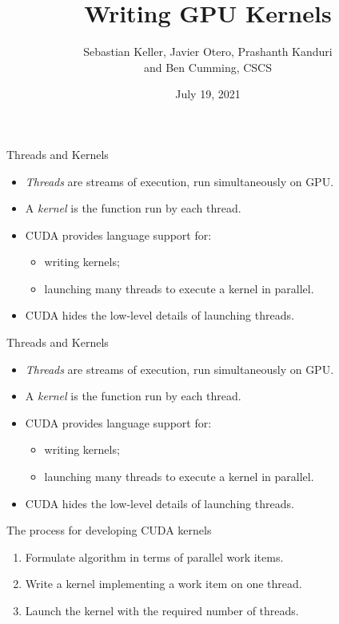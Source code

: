\documentclass[aspectratio=43]{beamer}
\author{Sebastian Keller, Javier Otero, Prashanth Kanduri\\ and Ben Cumming, CSCS}
\title{Writing GPU Kernels}
\subtitle{}
\date{July 19, 2021}
\begin{document}
\cscstitle


\begin{frame}[fragile]{Threads and Kernels}
    \begin{itemize}
        \item \emph{Threads} are streams of execution, run simultaneously on GPU.
        \item A \emph{kernel} is the function run by each thread.
        \item CUDA provides language support for:
        \begin{itemize}
            \item writing kernels;
            \item launching many threads to execute a kernel in parallel.
        \end{itemize}
        \item CUDA hides the low-level details of launching threads.
    \end{itemize}
\end{frame}

\begin{frame}[fragile]{Threads and Kernels}
    \begin{itemize}
        \item \emph{Threads} are streams of execution, run simultaneously on GPU.
        \item A \emph{kernel} is the function run by each thread.
        \item CUDA provides language support for:
        \begin{itemize}
            \item writing kernels;
            \item launching many threads to execute a kernel in parallel.
        \end{itemize}
        \item CUDA hides the low-level details of launching threads.
    \end{itemize}

    \begin{info}{The process for developing CUDA kernels}
        \begin{enumerate}
            \item Formulate algorithm in terms of parallel work items.
            \item Write a kernel implementing a work item on one thread.
            \item Launch the kernel with the required number of threads.
        \end{enumerate}
    \end{info}
\end{frame}
\end{document}
